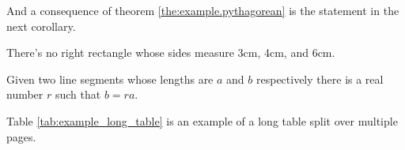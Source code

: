 And a consequence of theorem \ref{the:example.pythagorean} is the statement in the next 
corollary.

\begin{corollary}
	There's no right rectangle whose sides measure 3cm, 4cm, and 6cm.
\end{corollary}

\begin{lemma}
	Given two line segments whose lengths are \(a\) and \(b\) respectively there is a 
	real number \(r\) such that \(b=ra\).
\end{lemma}


\lipsum[7]

\clearpage


Table \ref{tab:example_long_table} is an example of a long table split over multiple pages.

\vspace{10mm}

